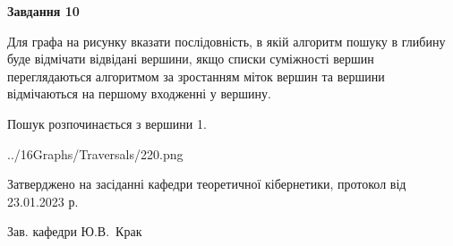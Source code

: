 \documentclass[12pt, ukrainian]{article}
\begin{document}
{\begin {large}
{\begin {center}\textbf{Завдання 10}\end {center}}\par
Для графа на рисунку вказати послідовність, в якій алгоритм пошуку в глибину буде відмічати відвідані вершини, якщо списки суміжності вершин переглядаються алгоритмом за зростанням міток вершин та вершини відмічаються на першому вход\-женні у вершину.\par
Пошук розпочинається з вершини 1.\par

\begin{center}
	{../16Graphs/Traversals/220.png}
\end{center}\par
\newpage


\end {large}
}
{\smallskip \begin {small} Затверджено на засіданні кафедри теоретичної кібернетики, протокол  від   23.01.2023 р.\par\smallskip\smallskip
{\parbox {6.5 cm}{Зав. кафедри \dotfill Ю.В.~Крак}} \end{small}}
\end{document}
